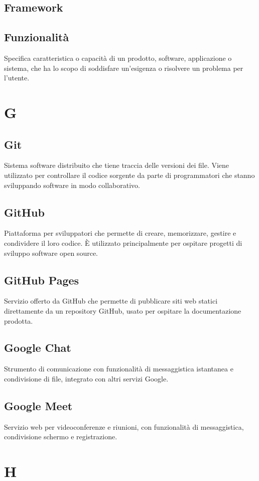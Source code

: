     \subsection{Framework}
    \subsection{Funzionalità}
    Specifica caratteristica o capacità di un prodotto, software, applicazione o sistema, 
    che ha lo scopo di soddisfare un'esigenza o risolvere un problema per l'utente.
\section{G}
    \subsection{Git}
    Sistema software distribuito che tiene traccia delle versioni dei file. 
    Viene utilizzato per controllare il codice sorgente da parte di programmatori 
    che stanno sviluppando software in modo collaborativo.
    \subsection{GitHub}
    Piattaforma per sviluppatori che permette di creare, memorizzare, gestire 
    e condividere il loro codice. È utilizzato principalmente per ospitare 
    progetti di sviluppo software open source.
    \subsection{GitHub Pages}
    Servizio offerto da GitHub che permette di pubblicare siti web statici direttamente da un repository GitHub,
    usato per ospitare la documentazione prodotta.
    \subsection{Google Chat}
    Strumento di comunicazione con funzionalità di messaggistica
    istantanea e condivisione di file, integrato con altri servizi Google.
    \subsection{Google Meet}    
    Servizio web per videoconferenze e riunioni, con funzionalità di messaggistica,
    condivisione schermo e registrazione.
\section{H}
